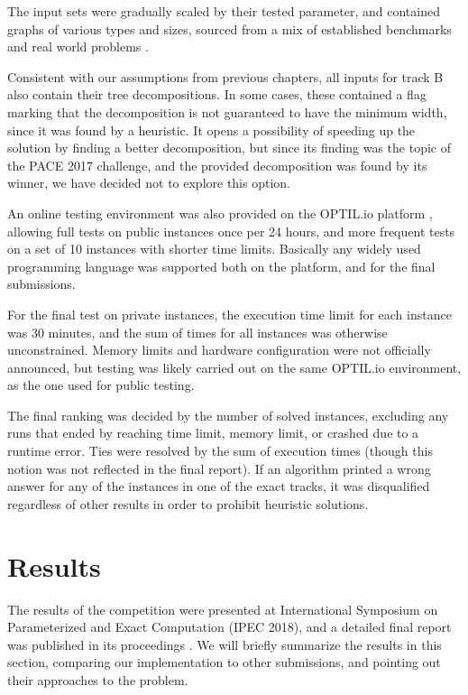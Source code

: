 \documentclass[thesis=M,english,hidelinks]{FITthesis}[2012/10/20]
\theoremstyle{definition}
\begin{document}
The input sets were gradually scaled by their tested parameter, and contained graphs of various types and sizes, sourced
from a mix of established benchmarks and real world problems \cite{PacePresentation}.

Consistent with our assumptions from previous chapters, all inputs for track B also contain their tree decompositions.
In some cases, these contained a flag marking that the decomposition is not guaranteed to have the minimum width, since
it was found by a heuristic. It opens a possibility of speeding up the solution by finding a better decomposition, but
since its finding was the topic of the PACE 2017 challenge, and the provided decomposition was found by its winner, we
have decided not to explore this option.

An online testing environment was also provided on the OPTIL.io platform \cite{OptilIo}, allowing full tests on public
instances once per 24 hours, and more frequent tests on a set of 10 instances with shorter time limits. Basically any
widely used programming language was supported both on the platform, and for the final submissions.

For the final test on private instances, the execution time limit for each instance was 30 minutes, and the sum of times
for all instances was otherwise unconstrained. Memory limits and hardware configuration were not officially announced,
but testing was likely carried out on the same OPTIL.io environment, as the one used for public testing.

The final ranking was decided by the number of solved instances, excluding any runs that ended by reaching time limit,
memory limit, or crashed due to a runtime error. Ties were resolved by the sum of execution times (though this notion
was not reflected in the final report). If an algorithm printed a wrong answer for any of the instances in one of the
exact tracks, it was disqualified regardless of other results in order to prohibit heuristic solutions.

\section{Results}

The results of the competition were presented at International Symposium on Parameterized and Exact Computation (IPEC
2018), and a detailed final report was published in its proceedings \cite{PaceReport}. We will briefly summarize
the results in this section, comparing our implementation to other submissions, and pointing out their approaches to the
problem.
\end{document}
